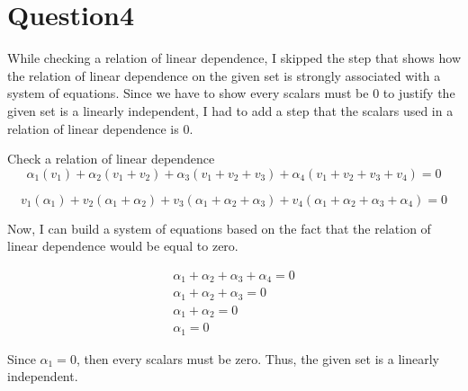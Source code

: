 \documentclass{article}
\begin{document}
\section{Question4}

While checking a relation of linear dependence, I skipped the step that shows how the relation of linear dependence on the given set is strongly associated with a system of equations.
Since we have to show every scalars must be \(0\) to justify the given set is a linearly independent, I had to add a step that the scalars used in a relation of linear dependence is \(0\).

\bigskip

Check a relation of linear dependence
\begin{equation}
  \alpha_1(v_1) + \alpha_2(v_1 + v_2) + \alpha_3(v_1+v_2+v_3) + \alpha_4(v_1+v_2+v_3+v_4) = 0
\end{equation}

\begin{equation}
v_1(\alpha_1) + v_2(\alpha_1 + \alpha_2) + v_3(\alpha_1 + \alpha_2 + \alpha_3) + v_4(\alpha_1 + \alpha_2 + \alpha_3 + \alpha_4) = 0
\end{equation}

Now, I can build a system of equations based on the fact that the relation of linear dependence would be equal to zero.

\begin{equation}
  \begin{matrix}
    \alpha_1 + \alpha_2 + \alpha_3 + \alpha_4 = 0 \\
    \alpha_1 + \alpha_2 + \alpha_3 = 0 \\
    \alpha_1 + \alpha_2 = 0 \\
    \alpha_1 = 0
  \end{matrix}
\end{equation}

Since \(\alpha_1 = 0\), then every scalars must be zero. Thus, the given set is a linearly independent.
\end{document}
